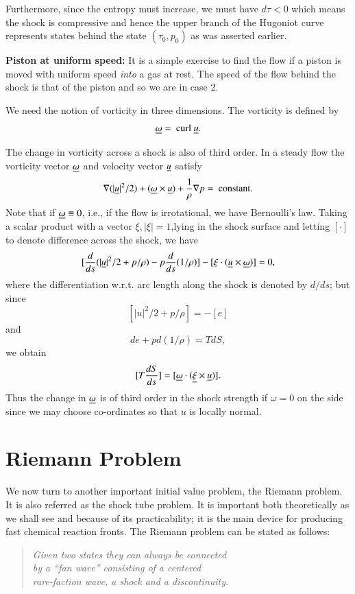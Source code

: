 Furthermore, since the entropy must increase, we must have $d\tau < 0$ which means the shock is compressive and hence the upper branch of the Hugoniot curve represents states behind the state $(\tau_0, p_0)$ as was asserted earlier.

\begin{exer*}
\textbf{Piston at uniform speed: } It is a simple exercise to find the flow if a piston is moved with uniform speed {\em into} a gas at rest. The speed of the flow behind the shock is that of the piston and so we are in case 2. 
\end{exer*}

\begin{remark*}
We need the notion of vorticity in three dimensions. The vorticity is defined by
$$
\underline{\omega} = \text{ curl } \underline{u}.
$$
\end{remark*}

\begin{claim*}
The change in vorticity across a shock is also of third order. In a steady flow the vorticity vector $\underline{\omega}$ and velocity vector $\underline{u}$ satisfy
$$
\nabla (|\underline{u}|^2/2) + (\underline{\omega} \times \underline{u}) + \frac{1}{\rho} \nabla p = \text{ constant.}
$$
Note that if $\underline{\omega} \equiv 0$, i.e., if the flow is irrotational, we have Bernoulli's law. Taking a scalar product with a vector $\xi,|\xi| = 1$,\pageoriginale lying in the shock surface and letting $[\cdot]$ to denote difference across the shock, we have
$$
[\frac{d}{ds} (|\underline{u}|^2 / 2 + p / \rho) - p \frac{d}{ds} (1/\rho)] - [\xi \cdot (\underline{u} \times \underline{\omega})] = 0, 
$$
where the differentiation w.r.t. arc length along the shock is denoted by $d/ds$; but since
$$
[|u|^2 / 2 + p/ \rho] = - [e]
$$
and 
$$
de + pd (1/\rho) = TdS,
$$
we obtain
$$
[T \frac{dS}{ds}] = [\underline{\omega} \cdot (\underline{\xi} \times \underline{u})]. 
$$
Thus the change in $\underline{\omega}$ is of third order in the shock strength if $\omega = 0$ on the side since we may choose co-ordinates so that $u$ is locally normal.
\end{claim*}

\section{Riemann Problem}\label{chap2:sec2.8}

We now turn to another important initial value problem, the Riemann problem. It is also referred as the shock tube problem. It is important both theoretically as we shall see and because of its practicability; it is the main device for producing fast chemical reaction fronts. The Riemann problem can be stated as follows:
\begin{quote}
\textit{Given two states they can always be connected}\\
\textit{by a ``fan wave'' consisting of a centered}\\
\textit{rare-faction wave, a shock and a discontinuity.}
\end{quote}

